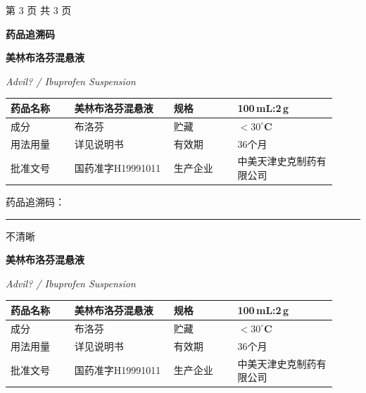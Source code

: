 \documentclass[UTF8,10pt,a4paper,fontset=fandol]{ctexart}
\newcommand{\fieldvalue}[1]{#1}
\newcommand{\handwritten}[1]{#1}
\begin{document}
\begin{center}
\small 第 3 页 共 3 页
\end{center}

\newpage

\begin{center}
\textbf{药品追溯码}

\vspace{0.5em}

\begin{minipage}{0.92\linewidth}
\centering
\textbf{\Large 美林布洛芬混悬液}

\smallskip
\textit{Advil? / Ibuprofen Suspension}

\begin{tabular}{|p{0.18\linewidth}|p{0.28\linewidth}|p{0.18\linewidth}|p{0.28\linewidth}|}
\hline
药品名称 & 美林布洛芬混悬液 & 规格 & 100\,mL:2\,g \\
\hline
成分 & 布洛芬 & 贮藏 & \textbf{$<30^\circ$C} \\
\hline
用法用量 & 详见说明书 & 有效期 & 36个月 \\
\hline
批准文号 & 国药准字H19991011 & 生产企业 & 中美天津史克制药有限公司 \\
\hline
\end{tabular}

\smallskip
药品追溯码：\rule{0.65\linewidth}{0.4pt}

\fieldvalue{\handwritten{不清晰}}
\end{minipage}

\vspace{1em}

\begin{minipage}{0.92\linewidth}
\centering
\textbf{\Large 美林布洛芬混悬液}

\smallskip
\textit{Advil? / Ibuprofen Suspension}

\begin{tabular}{|p{0.18\linewidth}|p{0.28\linewidth}|p{0.18\linewidth}|p{0.28\linewidth}|}
\hline
药品名称 & 美林布洛芬混悬液 & 规格 & 100\,mL:2\,g \\
\hline
成分 & 布洛芬 & 贮藏 & \textbf{$<30^\circ$C} \\
\hline
用法用量 & 详见说明书 & 有效期 & 36个月 \\
\hline
批准文号 & 国药准字H19991011 & 生产企业 & 中美天津史克制药有限公司 \\
\hline
\end{tabular}


\end{minipage}
\end{center}
\end{document}
